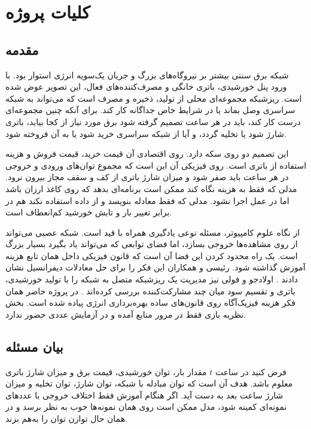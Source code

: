 \chapter{کلیات پروژه}
\label{chap:introduction}

\section{مقدمه}
شبکه برق سنتی بیشتر بر نیروگاه‌های بزرگ و جریان یک‌سویه انرژی استوار بود. با ورود پنل خورشیدی، باتری خانگی و مصرف‌کننده‌های فعال، این تصویر عوض شده است. ریزشبکه مجموعه‌ای محلی از تولید، ذخیره و مصرف است که می‌تواند به شبکه سراسری وصل بماند یا در شرایط خاص جداگانه کار کند. برای آنکه چنین مجموعه‌ای درست کار کند، باید در هر ساعت تصمیم گرفته شود برق مورد نیاز از کجا بیاید، باتری شارژ شود یا تخلیه گردد، و آیا از شبکه سراسری خرید شود یا به آن فروخته شود.

این تصمیم دو روی سکه دارد. روی اقتصادی آن قیمت خرید، قیمت فروش و هزینه استفاده از باتری است. روی فیزیکی آن این است که مجموع توان‌های ورودی و خروجی در هر ساعت باید صفر شود و میزان شارژ باتری از کف و سقف مجاز بیرون نرود. مدلی که فقط به هزینه نگاه کند ممکن است برنامه‌ای بدهد که روی کاغذ ارزان باشد اما در عمل اجرا نشود. مدلی که فقط معادله بنویسد و از داده استفاده نکند هم در برابر تغییر بار و تابش خورشید کم‌انعطاف است.

از نگاه علوم کامپیوتر، مسئله نوعی یادگیری همراه با قید است. شبکه عصبی می‌تواند از روی مشاهده‌ها خروجی بسازد، اما فضای توابعی که می‌تواند یاد بگیرد بسیار بزرگ است. یک راه محدود کردن این فضا آن است که قانون فیزیکی داخل همان تابع هزینه آموزش گذاشته شود. رئیسی و همکاران این فکر را برای حل معادلات دیفرانسیل نشان دادند . اولادجو و فولی نیز مدیریت یک ریزشبکه متصل به شبکه را با تولید خورشیدی، باتری و تقسیم سود میان چند مشارکت‌کننده بررسی کرده‌اند . در پروژه حاضر همان فکر هزینه فیزیک‌آگاه روی قانون‌های ساده بهره‌برداری انرژی پیاده شده است. بخش نظریه بازی فقط در مرور منابع آمده و در آزمایش عددی حضور ندارد.

\section{بیان مسئله}
فرض کنید در ساعت $t$ مقدار بار، توان خورشیدی، قیمت برق و میزان شارژ باتری معلوم باشد. هدف آن است که توان مبادله با شبکه، توان شارژ، توان تخلیه و میزان شارژ ساعت بعد به دست آید. اگر هنگام آموزش فقط اختلاف خروجی با عددهای نمونه‌ای کمینه شود، مدل ممکن است روی همان نمونه‌ها خوب به نظر برسد و در همان حال توازن توان را به‌هم بزند.

